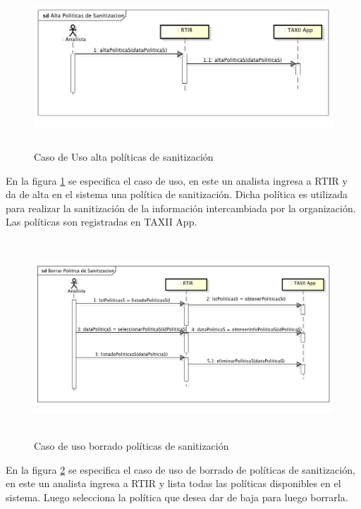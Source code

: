 \begin{figure}[ht!]
	\centering
	\includegraphics[width=5.7638in,height=2.3575in]{Analisis22-img/Analisis22-img017.png} 
	\caption{Caso de Uso alta políticas de sanitización}
	\label{fig.altasanitizacion}
\end{figure}
{
	\bigskip
	En la figura \ref{fig.altasanitizacion} se especifica el caso de uso, en este un analista ingresa a RTIR y da de alta en el sistema una política
	de sanitización. Dicha política es utilizada para realizar la sanitización de la información intercambiada por la
	organización. Las políticas son registradas en TAXII App.}
\begin{figure}[ht!]
	\centering
	\includegraphics[width=5.7638in,height=2.9146in]{Analisis22-img/Analisis22-img018.png} 
	\caption{Caso de uso borrado políticas de sanitización}
	\label{fig.borradosanitizacion}
\end{figure}

\bigskip

{
	En la figura \ref{fig.borradosanitizacion} se especifica el caso de uso de borrado de políticas de sanitización, en este un analista ingresa a RTIR
	y lista todas las políticas disponibles en el sistema. Luego selecciona la política que desea dar de baja para luego
	borrarla.}


